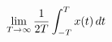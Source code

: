 \documentclass[preview]{standalone}
\begin{document}
\begin{align*}
\special{dvisvgm:raw <g id='unique000'>}\lim_{T\to\infty}\frac{1}{2T}\int_{-T}^{T}x(t)\,dt\special{dvisvgm:raw </g>}
\end{align*}
\end{document}
